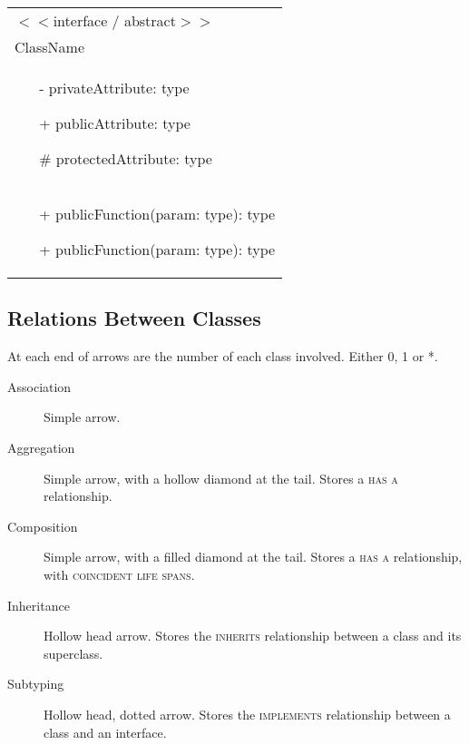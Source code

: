 \documentclass[landscape]{cheat}
\begin{document}
\begin{multicols*}{3}
\begin{tabular}{|p{}|}
\hline
    $<<$interface / abstract$>>$ \\
    ClassName \\
\hline
\begin{itemize}
    \item[-] privateAttribute: type
    \item[+] publicAttribute: type
    \item[\#] protectedAttribute: type
\end{itemize} \\ \hline
\begin{itemize}
    \item[+] publicFunction(param: type): type
    \item[+] publicFunction(param: type): type
\end{itemize} \\ \hline
\end{tabular}

\subsection{Relations Between Classes}
At each end of arrows are the number of each class involved. Either 0, 1 or *.
\begin{description}
    \item[Association]
        Simple arrow.
    \item[Aggregation]
        Simple arrow, with a hollow diamond at the tail.
        Stores a \textsc{has a} relationship.
    \item[Composition]
        Simple arrow, with a filled diamond at the tail.
        Stores a \textsc{has a} relationship, with \textsc{coincident life spans}.
    \item[Inheritance]
        Hollow head arrow.
        Stores the \textsc{inherits} relationship between a class and its superclass.
    \item[Subtyping]
        Hollow head, dotted arrow.
        Stores the \textsc{implements} relationship between a class and an interface.
\end{description}

\end{multicols*}
\end{document}
